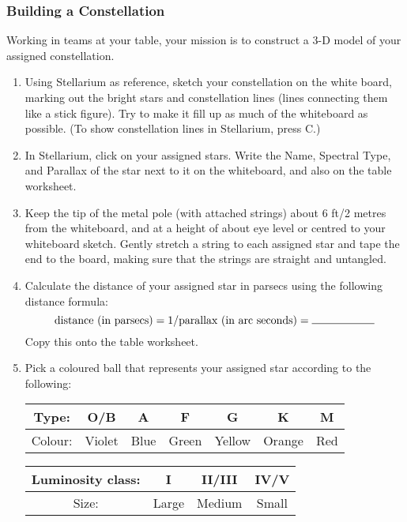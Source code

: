 \documentclass[main.tex]{subfiles}
\begin{document}
\subsubsection{Building a Constellation}
Working in teams at your table, your mission is to construct a 3-D model of your assigned constellation. 
\begin{enumerate}
\item Using Stellarium as reference, sketch your constellation on the white board, marking out the bright stars and constellation lines (lines connecting them like a stick figure). Try to make it fill up as much of the whiteboard as possible. (To show constellation lines in Stellarium, press C.)
\item In Stellarium, click on your assigned stars. Write the Name, Spectral Type, and Parallax of the star next to it on the whiteboard, and also on the table worksheet.
\item Keep the tip of the metal pole (with attached strings) about 6 ft/2 metres from the whiteboard, and at a height of about eye level or centred to your whiteboard sketch. Gently stretch a string to each assigned star and tape the end to the board, making sure that the strings are straight and untangled.
\item Calculate the distance of your assigned star in parsecs using the following distance formula:
\begin{equation*}
\text{distance (in parsecs)} = 1/\text{parallax (in arc seconds)} = \rule{2cm}{.15mm}
\end{equation*}
Copy this onto the table worksheet.
\item Pick a coloured ball that represents your assigned star according to the following:
\begin{table}[h!]
\begin{center}
\begin{tabular}{|c|c|c|c|c|c|c|}\hline
Type: & O/B & A & F & G & K & M \\\hline
Colour: & Violet & Blue & Green & Yellow & Orange & Red \\\hline
\end{tabular}
\end{center}
\label{tab:starcol}
\end{table}
\vspace{-35pt}
\begin{table}[h!]
\begin{center}
\begin{tabular}{|c|c|c|c|}\hline
Luminosity class: & I & II/III& IV/V \\\hline
Size: & Large & Medium & Small \\\hline
\end{tabular}
\end{center}
\label{tab:starsize}
\end{table}
\vspace{-20pt}


\end{enumerate}
\end{document}
